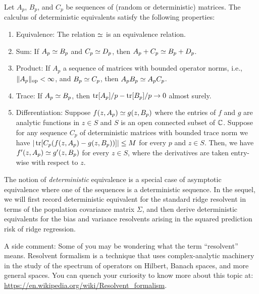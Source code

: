 \documentclass{article}
\begin{document}
\begin{lemma}
    \label{lem:calculus-detequi}
    Let $A_p$, $B_p$, and $C_p$ be sequences of (random or deterministic) matrices.
    The calculus of deterministic equivalents satisfy the following properties:
    \begin{enumerate}
        \item 
        \label{lem:calculus-detequi-item-equivalence}
        Equivalence:
        The relation $\simeq$ is an equivalence relation.
        \item 
        \label{lem:calculus-detequi-item-sum}
        Sum:
        If $A_p \simeq B_p$ and $C_p \simeq D_p$, then $A_p + C_p \simeq B_p + D_p$.
        \item 
        \label{lem:calculus-detequi-item-product}
        Product:
        If $A_p$ a sequence of matrices with bounded operator norms, i.e., $\| A_p \|_{\operatorname{op}} < \infty$,
        and $B_p \simeq C_p$, then $A_p B_p \simeq A_p C_p$.
        \item 
        \label{lem:calculus-detequi-item-trace}
        Trace:
        If $A_p \simeq B_p$, then $\operatorname{tr}[A_p] / p - \operatorname{tr}[B_p] / p \to 0$ almost surely.
        \item 
        \label{lem:calculus-detequi-item-differentiation}
        Differentiation:
        Suppose $f(z, A_p) \simeq g(z, B_p)$ where the entries of $f$ and $g$
        are analytic functions in $z \in S$ and $S$ is an open connected subset of $\mathbb{C}$.
        Suppose for any sequence $C_p$ of deterministic matrices with bounded trace norm
        we have $| \operatorname{tr}[C_p (f(z, A_p) - g(z, B_p))] | \le M$ for every $p$ and $z \in S$.
        Then, we have $f'(z, A_p) \simeq g'(z, B_p)$ for every $z \in S$,
        where the derivatives are taken entry-wise with respect to $z$.
    \end{enumerate}
\end{lemma}

The notion of \emph{deterministic} equivalence is a special case
of asymptotic equivalence 
where one of the sequences is a deterministic sequence. 
In the sequel, 
we will first record deterministic equivalent for the standard ridge resolvent 
in terms of the population covariance matrix $\Sigma$,
and then derive deterministic equivalents for the bias and variance resolvents
arising in the squared prediction risk of ridge regression.

A side comment:
Some of you may be wondering what the term ``resolvent'' means.
Resolvent formalism is a technique that uses complex-analytic machinery
in the study of the spectrum of operators on Hilbert, Banach spaces, 
and more general spaces.
You can quench your curiosity to know more about this topic at:
\url{https://en.wikipedia.org/wiki/Resolvent_formalism}.
\end{document}
